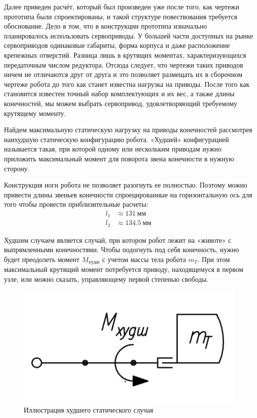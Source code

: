 Далее приведен расчёт, который был произведен уже после того, как чертежи прототипа были спроектированы, и такой структуре повествования требуется обоснование. Дело в том, что в конструкции прототипа изначально планировалось использовать сервоприводы. У большей части доступных на рынке сервоприводов одинаковые габариты, форма корпуса и даже расположение крепежных отверстий. Разница лишь в крутящих моментах, характеризующихся передаточным числом редуктора. Отсюда следует, что чертежи таких приводов ничем не отличаются друг от друга и это позволяет размещать их в сборочном чертеже робота до того как станет известна нагрузка на приводы. После того как становится известен точный набор комплектующих и их вес, а также длины конечностей, мы можем выбрать сервопривод, удовлетворяющий требуемому крутящему моменту.

Найдем максимальную статическую нагрузку на приводы конечностей рассмотрев наихудшую статическую конфигурацию робота. «Худшей» конфигурацией называется такая, при которой одному или нескольким приводам нужно приложить максимальный момент для поворота звена конечности в нужную сторону.

Конструкция ноги робота не позволяет разогнуть ее полностью. Поэтому можно привести длины звеньев конечности спроецированные на горизонтальную ось для того чтобы провести приблизительные расчеты:
\begin{align*}
    l_1 &\approx 131\: мм \\
    l_2 &\approx 134.5\: мм
\end{align*}

Худшим случаем является случай, при котором робот лежит на «животе» с выпрямленными конечностями. Чтобы подогнуть под себя конечность, нужно будет преодолеть момент $M_{худш}$ с учетом массы тела робота $m_T$. При этом максимальный крутящий момент потребуется приводу, находящемуся в первом узле, или можно сказать, управляющему первой степенью свободы.

\begin{figure}[ht]
    \centering
    \includegraphics[scale=1]{kin2.png}
    \caption{Иллюстрация худшего статического случая}
\end{figure}

